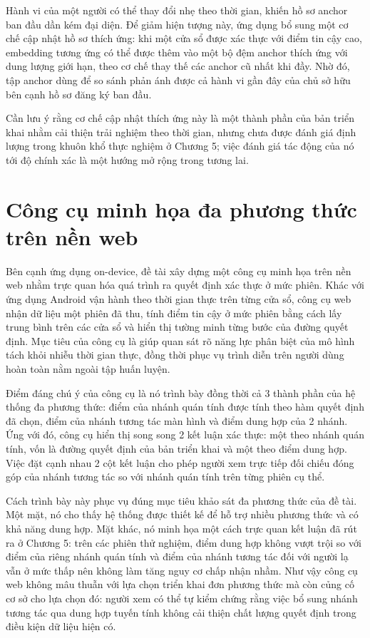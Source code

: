 \documentclass[../DoAn.tex]{subfiles}
\begin{document}
Hành vi của một người có thể thay đổi nhẹ theo thời gian, khiến hồ sơ anchor ban đầu dần kém đại diện. Để giảm hiện tượng này, ứng dụng bổ sung một cơ chế cập nhật hồ sơ thích ứng: khi một cửa sổ được xác thực với điểm tin cậy cao, embedding tương ứng có thể được thêm vào một bộ đệm anchor thích ứng với dung lượng giới hạn, theo cơ chế thay thế các anchor cũ nhất khi đầy. Nhờ đó, tập anchor dùng để so sánh phản ánh được cả hành vi gần đây của chủ sở hữu bên cạnh hồ sơ đăng ký ban đầu.

Cần lưu ý rằng cơ chế cập nhật thích ứng này là một thành phần của bản triển khai nhằm cải thiện trải nghiệm theo thời gian, nhưng chưa được đánh giá định lượng trong khuôn khổ thực nghiệm ở Chương 5; việc đánh giá tác động của nó tới độ chính xác là một hướng mở rộng trong tương lai.

\section{Công cụ minh họa đa phương thức trên nền web}
\label{sec:webdemo}

Bên cạnh ứng dụng on-device, đề tài xây dựng một công cụ minh họa trên nền web nhằm trực quan hóa quá trình ra quyết định xác thực ở mức phiên. Khác với ứng dụng Android vận hành theo thời gian thực trên từng cửa sổ, công cụ web nhận dữ liệu một phiên đã thu, tính điểm tin cậy ở mức phiên bằng cách lấy trung bình trên các cửa sổ và hiển thị tường minh từng bước của đường quyết định. Mục tiêu của công cụ là giúp quan sát rõ năng lực phân biệt của mô hình tách khỏi nhiễu thời gian thực, đồng thời phục vụ trình diễn trên người dùng hoàn toàn nằm ngoài tập huấn luyện.

Điểm đáng chú ý của công cụ là nó trình bày đồng thời cả 3 thành phần của hệ thống đa phương thức: điểm của nhánh quán tính được tính theo hàm quyết định đã chọn, điểm của nhánh tương tác màn hình và điểm dung hợp của 2 nhánh. Ứng với đó, công cụ hiển thị song song 2 kết luận xác thực: một theo nhánh quán tính, vốn là đường quyết định của bản triển khai và một theo điểm dung hợp. Việc đặt cạnh nhau 2 cột kết luận cho phép người xem trực tiếp đối chiếu đóng góp của nhánh tương tác so với nhánh quán tính trên từng phiên cụ thể.

Cách trình bày này phục vụ đúng mục tiêu khảo sát đa phương thức của đề tài. Một mặt, nó cho thấy hệ thống được thiết kế để hỗ trợ nhiều phương thức và có khả năng dung hợp. Mặt khác, nó minh họa một cách trực quan kết luận đã rút ra ở Chương 5: trên các phiên thử nghiệm, điểm dung hợp không vượt trội so với điểm của riêng nhánh quán tính và điểm của nhánh tương tác đối với người lạ vẫn ở mức thấp nên không làm tăng nguy cơ chấp nhận nhầm. Như vậy công cụ web không mâu thuẫn với lựa chọn triển khai đơn phương thức mà còn củng cố cơ sở cho lựa chọn đó: người xem có thể tự kiểm chứng rằng việc bổ sung nhánh tương tác qua dung hợp tuyến tính không cải thiện chất lượng quyết định trong điều kiện dữ liệu hiện có.
\end{document}
